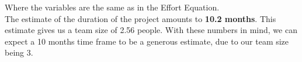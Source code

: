 	Where the variables are the same as in the Effort Equation.\\
	The estimate of the duration of the project amounts to \textbf{10.2 months}. This estimate gives us a team size of 2.56 people.
	With these numbers in mind, we can expect a 10 months time frame to be a generous estimate, due to our team size being 3.
	
	